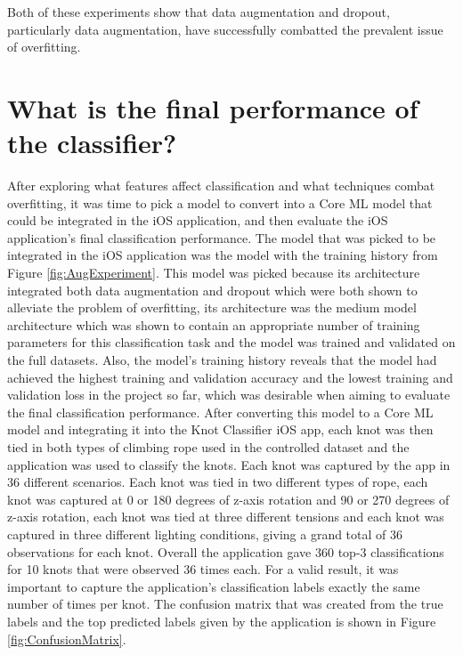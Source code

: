 \documentclass{l4proj}
\begin{document}
Both of these experiments show that data augmentation and dropout, particularly data augmentation, have successfully combatted the prevalent issue of overfitting.

\section{What is the final performance of the classifier?}
After exploring what features affect classification and what techniques combat overfitting, it was time to pick a model to convert into a Core ML model that could be integrated in the iOS application, and then evaluate the iOS application's final classification performance.
The model that was picked to be integrated in the iOS application was the model with the training history from Figure \ref{fig:AugExperiment}.
This model was picked because its architecture integrated both data augmentation and dropout which were both shown to alleviate the problem of overfitting, its architecture was the medium model architecture which was shown to contain an appropriate number of training parameters for this classification task and the model was trained and validated on the full datasets.
Also, the model's training history reveals that the model had achieved the highest training and validation accuracy and the lowest training and validation loss in the project so far, which was desirable when aiming to evaluate the final classification performance.
After converting this model to a Core ML model and integrating it into the Knot Classifier iOS app, each knot was then tied in both types of climbing rope used in the controlled dataset and the application was used to classify the knots.
Each knot was captured by the app in 36 different scenarios. 
Each knot was tied in two different types of rope, each knot was captured at 0 or 180 degrees of z-axis rotation and 90 or 270 degrees of z-axis rotation, each knot was tied at three different tensions and each knot was captured in three different lighting conditions, giving a grand total of 36 observations for each knot.
Overall the application gave 360 top-3 classifications for 10 knots that were observed 36 times each.
For a valid result, it was important to capture the application's classification labels exactly the same number of times per knot.
The confusion matrix that was created from the true labels and the top predicted labels given by the application is shown in Figure \ref{fig:ConfusionMatrix}.
\end{document}
